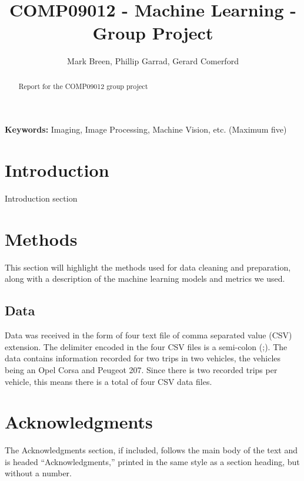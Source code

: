 \documentclass[a4paper,11pt]{article}
\begin{document}
\title{COMP09012 - Machine Learning - Group Project}

\author{Mark Breen, Phillip Garrad, Gerard Comerford}
\date{}
\maketitle
\thispagestyle{empty}



\begin{abstract}
Report for the COMP09012 group project
\end{abstract}
\textbf{Keywords:} Imaging, Image Processing, Machine Vision, etc. (Maximum five)



\section{Introduction}

Introduction section


\section{Methods}

This section will highlight the methods used for data cleaning and preparation, along with a description of the machine learning models and metrics we used.

\subsection{Data}

Data was received in the form of four text file of comma separated value (CSV) extension. The delimiter encoded in the four CSV files is a semi-colon (;). The data contains information recorded for two trips in two vehicles, the vehicles being an Opel Corsa and Peugeot 207. Since there is two recorded trips per vehicle, this means there is a total of four CSV data files.




\section*{Acknowledgments}

The Acknowledgments section, if included,
		       follows the main body of the text and is headed
		       ``Acknowledgments,'' printed in the same style
		       as a section heading, but without a number.
\end{document}
